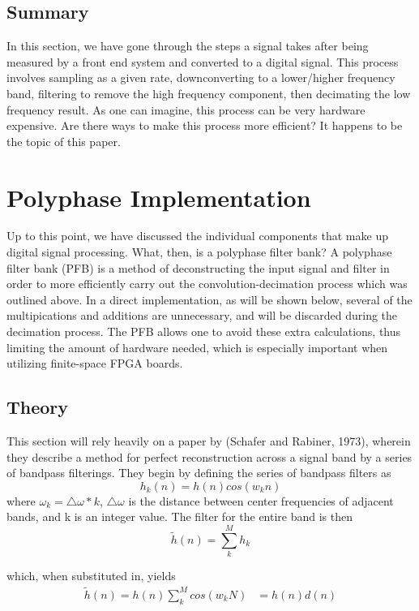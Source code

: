 \documentclass{report}
\begin{document}
\section{Summary}
In this section, we have gone through the steps a signal takes after being measured by a front end system and converted to a digital signal.  This process involves sampling as a given rate, downconverting to a lower/higher frequency band, filtering to remove the high frequency component, then decimating the low frequency result.  As one can imagine, this process can be very hardware expensive.  Are there ways to make this process more efficient? It happens to be the topic of this paper.


\chapter{Polyphase Implementation}

Up to this point, we have discussed the individual components that make up digital signal processing.  What, then, is a polyphase filter bank?  A polyphase filter bank (PFB) is a method of deconstructing the input signal and filter in order to more efficiently carry out the convolution-decimation process which was outlined above.  In a direct implementation, as will be shown below, several of the multipications and additions are unnecessary, and will be discarded during the decimation process.  The PFB allows one to avoid these extra calculations, thus limiting the amount of hardware needed, which is especially important when utilizing finite-space FPGA boards.
\section{Theory}
This section will rely heavily on a paper by (Schafer and Rabiner, 1973), wherein they describe a method for perfect reconstruction across a signal band by a series of bandpass filterings.  They begin by defining the series of bandpass filters as 
\begin{equation}
h_k(n) = h(n)cos(w_kn)
\end{equation}
where $\omega_k=\triangle\omega * k$, $\triangle\omega$ is the distance between center frequencies of adjacent bands, and k is an integer value.  The filter for the entire band is then
\begin{equation}
\widetilde{h}(n) = \sum_k^M h_k
\end{equation}

which, when substituted in, yields
\begin{align}
\widetilde{h}(n) = h(n)\sum_k^M cos(w_kN)
& = h(n)d(n)
\end{align}
\end{document}
